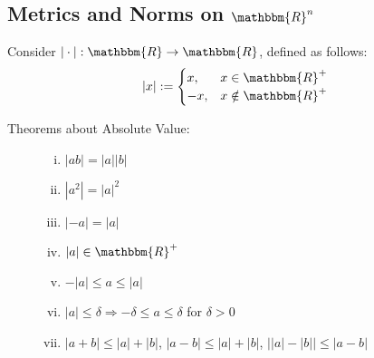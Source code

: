 \documentclass[10pt]{extarticle}
\newcommand{\R}{\mathbbm{R}}
\begin{document}
  \subsection{Metrics and Norms on $\R^n$}%
    Consider $|\cdot|: \R \rightarrow \R$, defined as follows:
    \[
      |x| := \begin{cases}
        x,&x\in\R^+\\
        -x,&x\notin\R^+
      \end{cases}
    \] 
    \begin{description}
      \item[Theorems about Absolute Value:]\hfill
        \begin{enumerate}[(i)]
          \item $|ab| = |a||b|$
          \item $|a^2| = |a|^2$
          \item $|-a| = |a|$
          \item $|a|\in\R^+$
          \item $-|a| \leq a \leq |a|$
          \item $|a| \leq \delta \Rightarrow -\delta \leq a \leq \delta$ for $\delta > 0$
          \item $|a+b| \leq |a| + |b|$, $|a-b| \leq |a| + |b|$, $\vert|a| - |b|\vert \leq |a-b|$
        \end{enumerate}
    \end{description}
\end{document}
